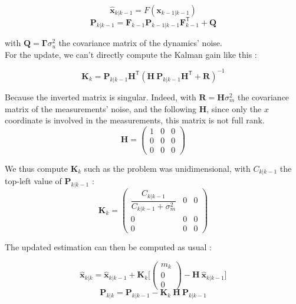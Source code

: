 \documentclass[english, DIV=13]{scrartcl}
\renewcommand{\vec}[1]{\mathbf{#1}}
\begin{document}
\[ \vec{\hat{x}}_{k|k-1} = F(\vec{x}_{k-1|k-1}) \]
\[ \vec{P}_{k|k-1} = \vec{F}_{k-1} \vec{P}_{k-1|k-1} \vec{F}_{k-1}^\mathsf{T} + \vec{Q} \]

with $\vec{Q} = \vec{\Gamma} \sigma_u^2$ the covariance matrix of the dynamics' noise.\\
For the update, we can't directly compute the Kalman gain like this :

\[ \vec{K}_k = \vec{P}_{k|k-1} \vec{H}^\mathsf{T} (\vec{H} ~ \vec{P}_{k|k-1} \vec{H}^\mathsf{T} + \vec{R})^{-1} \]

Because the inverted matrix is singular. Indeed, with $\vec{R} = \vec{H} \sigma_m^2$ the covariance matrix of the measurements' noise, and the following $\vec{H}$, since only the $x$ coordinate is involved in the measurements, this matrix is not full rank.
\begin{equation*}
\vec{H} = 
    \begin{pmatrix}
        1 & 0 & 0 \\
        0 & 0 & 0 \\
        0 & 0 & 0
    \end{pmatrix}
\end{equation*}

We thus compute $\vec{K}_k$ such as the problem was unidimensional, with $C_{k|k-1}$ the top-left value of $\vec{P}_{k|k-1}$ :
\begin{equation*}
\vec{K}_k = 
    \begin{pmatrix}
        \dfrac{C_{k|k-1}}{C_{k|k-1} + \sigma_m^2} & 0 & 0 \\
        0 & 0 & 0 \\
        0 & 0 & 0
    \end{pmatrix}
\end{equation*}

The updated estimation can then be computed as usual :


\[ \vec{\hat{x}}_{k|k} = \vec{\hat{x}}_{k|k-1} + \vec{K}_k \Bigg[ \begin{pmatrix} m_k \\ 0 \\ 0 \end{pmatrix} - \vec{H} ~ \vec{\hat{x}}_{k|k-1} \Bigg] \]
\[ \vec{P}_{k|k} = \vec{P}_{k|k-1} - \vec{K}_k ~ \vec{H} ~ \vec{P}_{k|k-1} \]
\end{document}
